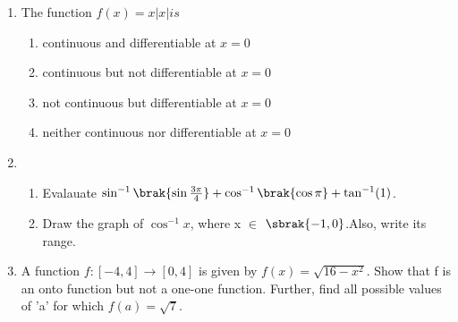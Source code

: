 \begin{enumerate}
\item The function $f(x)=x\lvert x \rvert is$
    \begin{enumerate}
        \item  continuous and differentiable at $x=0$
        \item  continuous but not differentiable at $x=0$
        \item  not continuous but differentiable at $x=0$
        \item neither continuous nor differentiable at $x=0$  
    \end{enumerate}
		\item \begin{enumerate}
         \item Evalauate $\sin^{-1}\brak{\sin \frac{3\pi}{4}} + \cos^{-1}\brak{\cos \pi } + \tan^{-1}(1)$.
         \item Draw the graph of $\cos^{-1} x$, where x $\in$ $\sbrak{-1, 0}$.Also, write its range.
     \end{enumerate}
	      \item A function $f: [-4, 4] \rightarrow [0, 4]$ is given by $f(x) = \sqrt{16 - x^2}$. Show that f is an onto function but not a one-one function. Further, find all possible values of 'a' for which $f(a) = \sqrt{7}.$
\end{enumerate}

%
